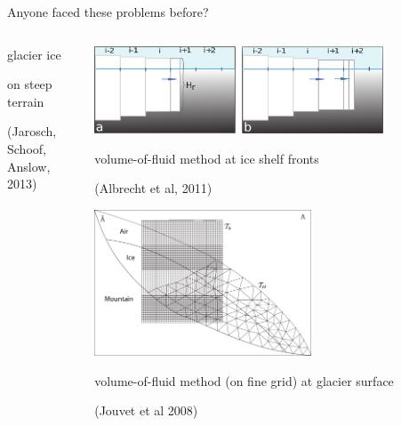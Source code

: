 \documentclass{beamer}
\begin{document}
\begin{frame}{Anyone faced these problems before?}
{\begin{columns}
\begin{column}{0.3\textwidth}
\small glacier ice

on steep terrain

\smallskip
\tiny (Jarosch, Schoof, Anslow, 2013)
\end{column}

\begin{column}{0.6\textwidth}
\includegraphics[width=0.8\textwidth,keepaspectratio=true]{Albrechtetal2011}

\small volume-of-fluid method at ice shelf fronts

\tiny (Albrecht et al, 2011)

\small \medskip
\includegraphics[width=0.6\textwidth,keepaspectratio=true]{jouvet-two-grids}

\small volume-of-fluid method (on fine grid) at glacier surface

\tiny (Jouvet et al 2008)
\end{column}
\end{columns}}

\end{frame}
\end{document}
